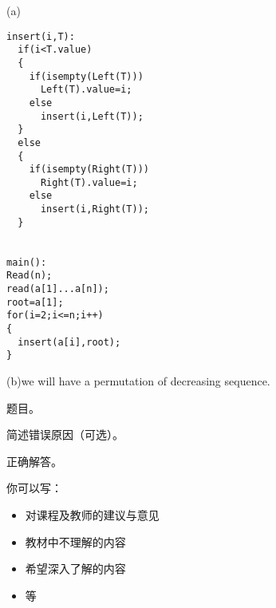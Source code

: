 \documentclass[11pt, a4paper, UTF8]{ctexart}
\begin{document}
\begin{solution}
(a) 
\begin{verbatim}
insert(i,T):
  if(i<T.value)
  {
    if(isempty(Left(T)))
      Left(T).value=i;
    else
      insert(i,Left(T));
  }
  else
  {
    if(isempty(Right(T)))
      Right(T).value=i;
    else
      insert(i,Right(T));
  }


main():
Read(n);
read(a[1]...a[n]);
root=a[1];
for(i=2;i<=n;i++)
{
  insert(a[i],root);
}

\end{verbatim}
(b)we will have a permutation of decreasing sequence.\\

\end{solution}











\begincorrection	%

\begin{problem}[题号]
  题目。
\end{problem}

\begin{cause}
  简述错误原因（可选）。
\end{cause}

\begin{revision}
  正确解答。
\end{revision}
\beginfb	%

你可以写：
\begin{itemize}
  \item 对课程及教师的建议与意见
  \item 教材中不理解的内容
  \item 希望深入了解的内容
  \item 等
\end{itemize}
\end{document}
